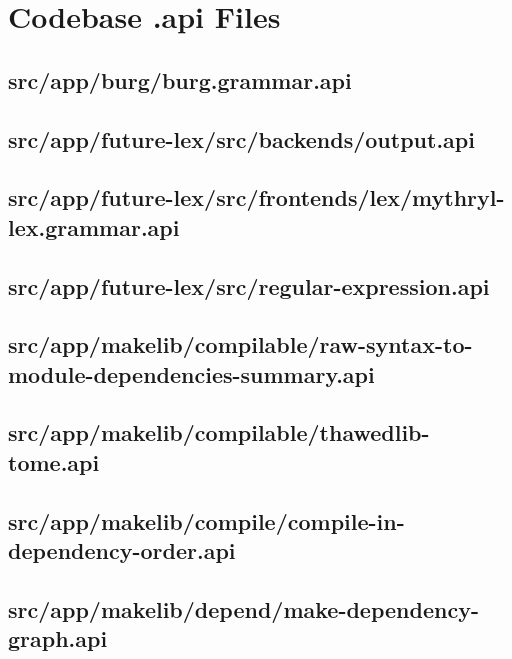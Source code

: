 \section{Codebase .api Files}



\subsection{src/app/burg/burg.grammar.api}


\subsection{src/app/future-lex/src/backends/output.api}


\subsection{src/app/future-lex/src/frontends/lex/mythryl-lex.grammar.api}


\subsection{src/app/future-lex/src/regular-expression.api}


\subsection{src/app/makelib/compilable/raw-syntax-to-module-dependencies-summary.api}


\subsection{src/app/makelib/compilable/thawedlib-tome.api}


\subsection{src/app/makelib/compile/compile-in-dependency-order.api}


\subsection{src/app/makelib/depend/make-dependency-graph.api}


